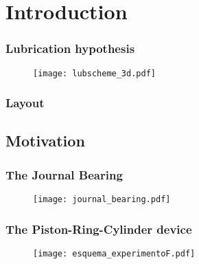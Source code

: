 \documentclass[10pt,aspectratio=169]{beamer}
\begin{document}
\setcounter{showProgressBar}{0}
\setcounter{showSlideNumbers}{1}

\frame{\titlepage}

\setcounter{showSlideNumbers}{0}
\section{Introduction}
\setcounter{showSlideNumbers}{1}


\begin{frame}
\frametitle{Lubrication hypothesis}
\vspace*{0.5cm}
\begin{figure}\hspace*{-0.3cm}
	\texttt{[image: lubscheme\_3d.pdf]}
\end{figure}
\end{frame}



\begin{frame}
\frametitle{Layout}
\tableofcontents[hideallsubsections]
\end{frame}

\subsection{Motivation}

\begin{frame}
\frametitle{The Journal Bearing}
\vspace*{0.7cm}
\begin{figure}
	\centering
	\texttt{[image: journal\_bearing.pdf]}
\end{figure}

\end{frame}


\begin{frame}
\frametitle{The Piston-Ring-Cylinder device}
\vspace*{0.5cm}
\begin{figure}\hspace*{-0.3cm}
	\texttt{[image: esquema\_experimentoF.pdf]}
\end{figure}
\end{frame}
\end{document}
